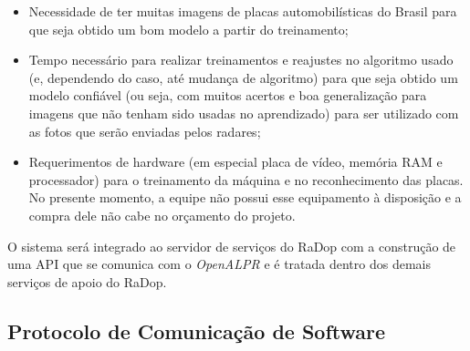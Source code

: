 \begin{itemize}
    \item Necessidade de ter muitas imagens de placas automobilísticas do Brasil para que seja obtido um bom modelo a partir do treinamento;
    \item Tempo necessário para realizar treinamentos e reajustes no algoritmo usado (e, dependendo do caso, até mudança de algoritmo) para que seja obtido um modelo confiável (ou seja, com muitos acertos e boa generalização para imagens que não tenham sido usadas no aprendizado) para ser utilizado com as fotos que serão enviadas pelos radares;
    \item Requerimentos de hardware (em especial placa de vídeo, memória RAM e processador) para o treinamento da máquina e no reconhecimento das placas. No presente momento, a equipe não possui esse equipamento à disposição e a compra dele não cabe no orçamento do projeto.
\end{itemize}

O sistema será integrado ao servidor de serviços do RaDop com a construção de uma API que se comunica com o \textit{OpenALPR} e é tratada dentro dos demais serviços de apoio do RaDop.

\subsection{Protocolo de Comunicação de Software}

